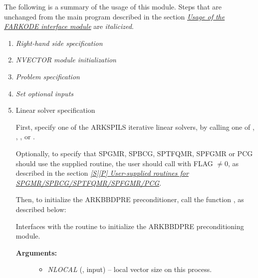 \documentclass[letterpaper,10pt,english]{sphinxmanual}
\begin{document}
The following is a summary of the usage of this module. Steps that are
unchanged from the main program described in the section
{\hyperref[f_interface/Usage:finterface-usage]{\emph{Usage of the FARKODE interface module}}} are \emph{italicized}.
\begin{enumerate}
\item {} 
\emph{Right-hand side specification}

\item {} 
\emph{NVECTOR module initialization}

\item {} 
\emph{Problem specification}

\item {} 
\emph{Set optional inputs}

\item {} 
Linear solver specification

First, specify one of the ARKSPILS iterative linear solvers, by
calling one of {\hyperref[f_interface/Usage:f/_/FARKSPGMR]{}}, {\hyperref[f_interface/Usage:f/_/FARKSPBCG]{}},
{\hyperref[f_interface/Usage:f/_/FARKSPTFQMR]{}}, {\hyperref[f_interface/Usage:f/_/FARKSPFGMR]{}} or
{\hyperref[f_interface/Usage:f/_/FARKPCG]{}}.

Optionally, to specify that SPGMR, SPBCG, SPTFQMR, SPFGMR or PCG
should use the supplied {\hyperref[f_interface/Usage:f/_/FARKJTIMES]{}} routine, the user
should call {\hyperref[f_interface/Usage:f/_/FARKSPILSSETJAC]{}} with FLAG $\ne 0$,
as described in the section {\hyperref[f_interface/Usage:finterface-spilsusersupplied]{\emph{{[}S{]}{[}P{]} User-supplied routines for SPGMR/SPBCG/SPTFQMR/SPFGMR/PCG}}}.

Then, to initialize the ARKBBDPRE preconditioner, call the function
{\hyperref[f_interface/Preconditioning:f/_/FARKBBDINIT]{}}, as described below:

\begin{fulllineitems}
\label{f_interface/Preconditioning:f/_/FARKBBDINIT}
Interfaces with the {\hyperref[c_interface/Preconditioners:ARKBBDPrecInit]{}}
routine to initialize the ARKBBDPRE preconditioning module.
\begin{description}
\item[{\textbf{Arguments:}}] \leavevmode\begin{itemize}
\item {} 
\emph{NLOCAL} (, input) -- local vector size on this
process.


\end{itemize}
\end{description}
\end{fulllineitems}
\end{enumerate}
\end{document}
